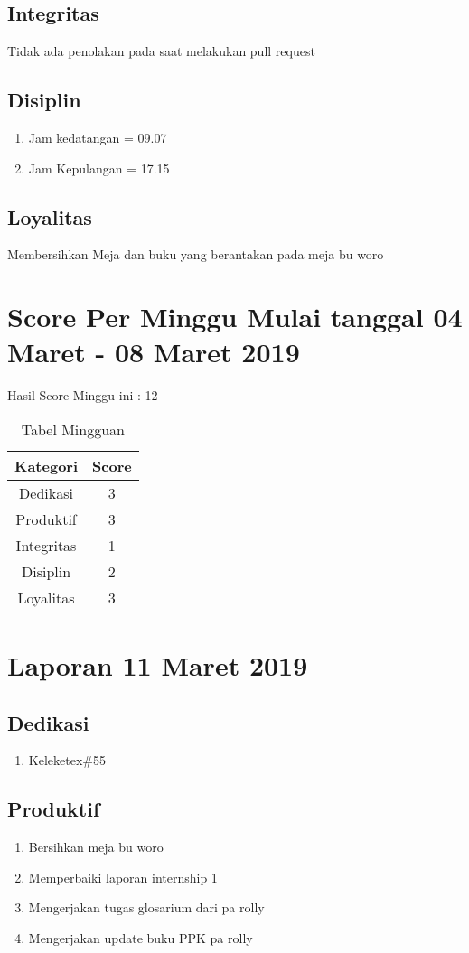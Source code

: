 \subsection{Integritas}
Tidak ada penolakan pada saat melakukan pull request
\subsection{Disiplin}
\begin{enumerate}
\item Jam kedatangan = 09.07
\item Jam Kepulangan = 17.15
\end{enumerate}
\subsection{Loyalitas}
 Membersihkan Meja dan buku yang berantakan pada meja bu woro

\section {Score Per Minggu Mulai tanggal 04 Maret - 08 Maret 2019}
Hasil Score Minggu ini : 12
\begin{table}[h]
\caption{Tabel Mingguan}
\centering
\begin{tabular}{|c|c|}
\hline
\textbf{Kategori}&\textbf{Score}\\
\hline
Dedikasi&3\\
\hline
Produktif&3\\
\hline
Integritas&1\\
\hline
Disiplin&2\\
\hline
Loyalitas&3\\
\hline
\end{tabular}
\label{tsble:Laporan mingguan}
\end{table}

\section{Laporan 11 Maret 2019}
\subsection{Dedikasi}
\begin{enumerate}
\item Keleketex\#55
\end{enumerate}
\subsection{Produktif}
\begin{enumerate}
\item Bersihkan meja bu woro
\item Memperbaiki laporan internship 1
\item Mengerjakan tugas glosarium dari pa rolly
\item Mengerjakan update buku PPK pa rolly
\end{enumerate}
